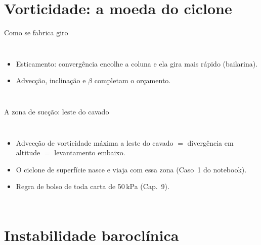 \documentclass[aspectratio=169,11pt]{beamer}
\begin{document}
\section{Vorticidade: a moeda do ciclone}

\begin{frame}{Como se fabrica giro}
  \begin{columns}
    \vspace{0.4em}
    \begin{itemize}
      \item \alert{Esticamento}: convergência encolhe a coluna e ela
            gira mais rápido (bailarina).
      \item Advecção, inclinação e $\beta$ completam o orçamento.
    \end{itemize}
  \end{columns}
\end{frame}

\begin{frame}{A zona de sucção: leste do cavado}
  \begin{columns}
    \begin{itemize}
      \item Advecção de vorticidade máxima a leste do cavado $=$
            divergência em altitude $=$ levantamento embaixo.
      \item O ciclone de superfície nasce e viaja com essa zona
            (Caso~1 do notebook).
      \item Regra de bolso de toda carta de 50\,kPa (Cap.~9).
    \end{itemize}
  \end{columns}
\end{frame}

\section{Instabilidade baroclínica}
\end{document}
